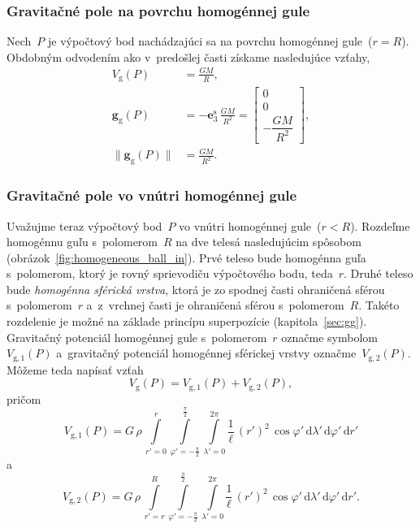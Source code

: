 \documentclass[a4paper, 12pt]{book}
\newcommand{\diff}{\mathrm d}
\newcommand{\gidx}{\mathrm g}
\let\vec\mathbf
\begin{document}
\subsubsection{Gravitačné pole na povrchu homogénnej gule}

Nech~$P$ je výpočtový bod nachádzajúci sa na povrchu homogénnej gule~($r = R$).  
Obdobným odvodením ako v~predošlej časti získame nasledujúce vzťahy,
%
\begin{align}
\label{eq:vg_ball_on}
V_\gidx(P) &= \frac{GM}{R}{,}\\
%
\label{eq:gg_ball_on}
\vec g_\gidx(P) &= -\vec e_3^\mathrm{s} \, \frac{GM}{R^2} =
%
\begin{bmatrix}
0\\
0\\
-\dfrac{GM}{R^2}
\end{bmatrix}
{,}\\
%
\label{eq:gg_ball_on_magnitude}
\| \vec g_\gidx(P) \| &= \frac{GM}{R^2}{.}
\end{align}

\subsubsection{Gravitačné pole vo vnútri homogénnej gule}

Uvažujme teraz výpočtový bod~$P$ vo vnútri homogénnej gule~($r < R$).  Rozdeľme 
homogénnu guľu s~polomerom~$R$ na dve telesá nasledujúcim spôsobom 
(obrázok~\ref{fig:homogeneous_ball_in}).  Prvé teleso bude homogénna guľa 
s~polomerom, ktorý je rovný sprievodiču výpočtového bodu, teda~$r$.  Druhé 
teleso bude \emph{homogénna sférická vrstva}, ktorá je zo spodnej časti 
ohraničená sférou s~polomerom~$r$ a~z~vrchnej časti je ohraničená sférou 
s~polomerom~$R$.  Takéto rozdelenie je možné na základe princípu superpozície 
(kapitola~\ref{sec:gg}).  Gravitačný potenciál homogénnej gule s~polomerom~$r$ 
označme symbolom~$V_{\gidx,1}(P)$ a~gravitačný potenciál homogénnej sférickej 
vrstvy označme~$V_{\gidx,2}(P)$.  Môžeme teda napísať vzťah
%
\begin{equation}
\label{eq:vg_ball_in_split}
V_\gidx(P) = V_{\gidx,1}(P) + V_{\gidx,2}(P){,}
\end{equation}
%
pričom
%
\begin{equation}
V_{\gidx,1}(P) = G \, \rho \, \int\limits_{r' = 0}^{r} \int\limits_{\varphi' 
= -\frac{\pi}{2}}^{\frac{\pi}{2}} \int\limits_{\lambda' = 0}^{2\pi} 
\frac{1}{\ell} \, (r')^2 \, \cos\varphi' \, \diff \lambda' \, \diff \varphi' \, 
\diff r'
\end{equation}
%
a
%
\begin{equation}
\label{eq:vg_ball_in_2}
V_{\gidx,2}(P) = G \, \rho \, \int\limits_{r' = r}^{R} \int\limits_{\varphi' 
= -\frac{\pi}{2}}^{\frac{\pi}{2}} \int\limits_{\lambda' = 0}^{2\pi} 
\frac{1}{\ell} \, (r')^2 \, \cos\varphi' \, \diff \lambda' \, \diff \varphi' \, 
\diff r'{.}
\end{equation}
\end{document}

